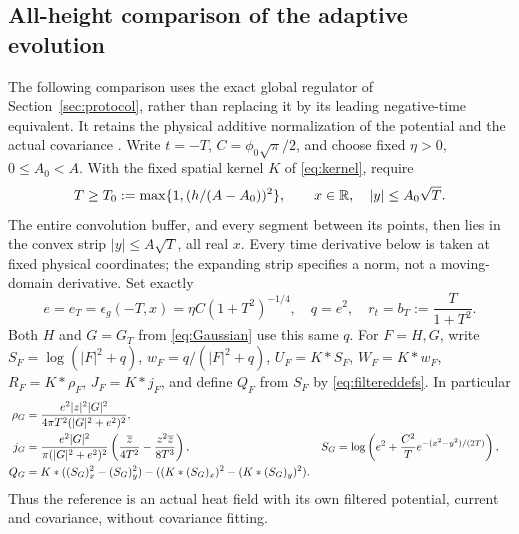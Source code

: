 \subsection{All-height comparison of the adaptive evolution}
The following comparison uses the exact global regulator of
Section~\ref{sec:protocol}, rather than replacing it by its leading
negative-time equivalent. It retains the physical additive normalization
of the potential and the actual covariance \cite{n26}.
Write $t=-T$, $C=\phi_0\sqrt\pi/2$, and choose fixed
$\eta>0$, $0\le A_0<A$. With the fixed spatial kernel $K$ of
\eqref{eq:kernel}, require
\begin{equation}
 T\ge T_0:=\max\{1,(h/(A-A_0))^2\},\qquad
 x\in\mathbb R,\quad |y|\le A_0\sqrt T.
 \label{eq:negative-buffer}
\end{equation}
The entire convolution buffer, and every segment between its points,
then lies in the convex strip $|y|\le A\sqrt T$, all real $x$.
Every time derivative below is taken at fixed physical coordinates;
the expanding strip specifies a norm, not a moving-domain derivative.
Set exactly
\begin{equation}
 e=e_T=\epsilon_g(-T,x)=\eta C(1+T^2)^{-1/4},\quad
 q=e^2,\quad r_t=b_T:=\frac{T}{1+T^2}.
 \label{eq:negative-exact-regulator}
\end{equation}
Both $H$ and $G=G_T$ from \eqref{eq:Gaussian} use this same $q$.
For $F=H,G$, write $S_F=\log(|F|^2+q)$,
$w_F=q/(|F|^2+q)$, $U_F=K*S_F$, $W_F=K*w_F$,
$R_F=K*\rho_F$, $J_F=K*j_F$, and define $Q_F$ from $S_F$
by \eqref{eq:filtereddefs}. In particular
\begin{align}
 \rho_G&=\frac{e^2|z|^2|G|^2}
 {4\pi T^2(|G|^2+e^2)^2},\notag\\
 j_G&=\frac{e^2|G|^2}{\pi(|G|^2+e^2)^2}
 \left(\frac{\overline z}{4T^2}
       -\frac{z^2\overline z}{8T^3}\right),
 &S_G&=\log\left(e^2+\frac{C^2}{T}
            e^{-(x^2-y^2)/(2T)}\right),
 \label{eq:negative-Gaussian-current}\\
 Q_G&=K*((S_G)_x^2-(S_G)_y^2)
       -((K*(S_G)_x)^2-(K*(S_G)_y)^2).
 \label{eq:negative-Gaussian-covariance}
\end{align}
Thus the reference is an actual heat field with its own filtered
potential, current and covariance, without covariance fitting.

